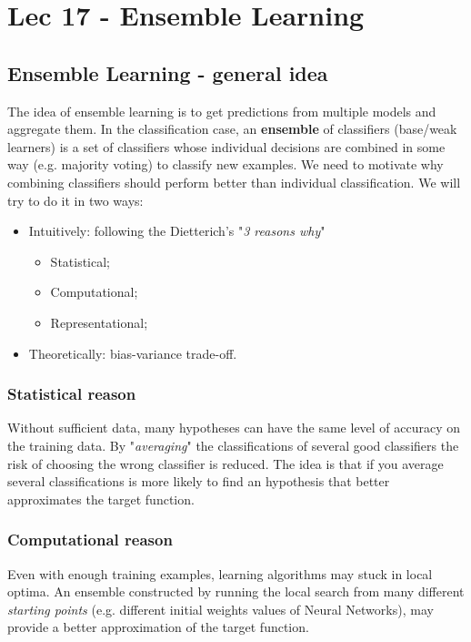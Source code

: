 \chapter{Lec 17 - Ensemble Learning}

\section{Ensemble Learning - general idea}
The idea of ensemble learning is to get predictions from multiple models and aggregate them. In the classification case, an \textbf{ensemble} of classifiers (base/weak learners) is a set of classifiers whose individual decisions are combined in some way (e.g. majority voting) to classify new examples.\newline\newline
We need to motivate why combining classifiers should perform better than individual classification. We will try to do it in two ways:
\begin{itemize}
    \item Intuitively: following the Dietterich's "\textit{3 reasons why}"
    \begin{itemize}
        \item Statistical;
        \item Computational;
        \item Representational;
    \end{itemize}
    \item Theoretically: bias-variance trade-off.
\end{itemize}

\subsection{Statistical reason}
Without sufficient data, many hypotheses can have the same level of accuracy on the training data. By "\textit{averaging}" the classifications of several good classifiers the risk of choosing the wrong classifier is reduced. The idea is that if you average several classifications is more likely to find an hypothesis that better approximates the target function.

\subsection{Computational reason}
Even with enough training examples, learning algorithms may stuck in local optima. An ensemble constructed by running the local search from many different \textit{starting points} (e.g. different initial weights values of Neural Networks), may provide a better approximation of the target function.

